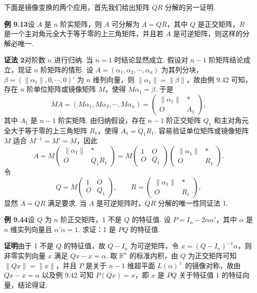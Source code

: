 \documentclass[UTF8,12pt,a4paper,fontset=fandol]{ctexart}
\begin{document}
下面是镜像变换的两个应用，首先我们给出矩阵 $QR$ 分解的另一证明.

\noindent\textbf{例 9.13}\quad 设 $A$ 是 $n$ 阶实矩阵，则 $A$ 可分解为 $A=QR$，其中 $Q$ 是正交矩阵，$R$ 是一个主对角元全大于等于零的上三角矩阵，并且若 $A$ 是可逆矩阵，则这样的分解必唯一.

\noindent\textbf{证法 2}\quad 对阶数 $n$ 进行归纳. 当 $n=1$ 时结论显然成立. 假设对 $n-1$ 阶矩阵结论成立，现证 $n$ 阶矩阵的情形. 设 $A=(\alpha_1,\alpha_2,\cdots,\alpha_n)$ 为其列分块，$\beta=(\|\alpha_1\|,0,\cdots,0)'$ 为 $n$ 维列向量，则 $\|\alpha_1\|=\|\beta\|$，故由例 9.42 可知，存在 $n$ 阶单位矩阵或镜像矩阵 $M$，使得 $M\alpha_1=\beta$. 于是
\[
MA=(M\alpha_1,M\alpha_2,\cdots,M\alpha_n)=
\begin{pmatrix}
\|\alpha_1\|&*\\
O&A_1
\end{pmatrix},
\]
其中 $A_1$ 是 $n-1$ 阶实矩阵. 由归纳假设，存在 $n-1$ 阶正交矩阵 $Q_1$ 和主对角元全大于等于零的上三角矩阵 $R_1$，使得 $A_1=Q_1R_1$. 容易验证单位矩阵或镜像矩阵 $M$ 适合 $M^{-1}=M'=M$，因此
\[
A=M\begin{pmatrix}
\|\alpha_1\|&*\\
O&Q_1R_1
\end{pmatrix}
=M\begin{pmatrix}
1&O\\
O&Q_1
\end{pmatrix}
\begin{pmatrix}
\|\alpha_1\|&*\\
O&R_1
\end{pmatrix}.
\]
令
\[
Q=M\begin{pmatrix}
1&O\\
O&Q_1
\end{pmatrix},\qquad
R=\begin{pmatrix}
\|\alpha_1\|&*\\
O&R_1
\end{pmatrix},
\]
显然 $A=QR$ 满足要求. 当 $A$ 是可逆矩阵时，$QR$ 分解的唯一性同证法 1.

\noindent\textbf{例 9.44}\quad 设 $Q$ 为 $n$ 阶正交矩阵，1 不是 $Q$ 的特征值. 设 $P=I_n-2\alpha\alpha'$，其中 $\alpha$ 是 $n$ 维实列向量且 $\alpha'\alpha=1$. 求证：1 是 $PQ$ 的特征值.

\noindent\textbf{证明}\quad 由于 1 不是 $Q$ 的特征值，故 $Q-I_n$ 为可逆矩阵，令 $x=(Q-I_n)^{-1}\alpha$，则非零实列向量 $x$ 满足 $Qx-x=\alpha$. 取 $\mathbb{R}^n$ 的标准内积，由 $Q$ 为正交矩阵可知 $\|Qx\|=\|x\|$，并且 $P$ 是关于 $n-1$ 维超平面 $L(\alpha)^\perp$ 的镜像对称，故由 $Qx-x=\alpha$ 以及例 9.42 可知 $P(Qx)=x$，即 $x$ 是 $PQ$ 关于特征值 1 的特征向量，结论得证.
\end{document}
